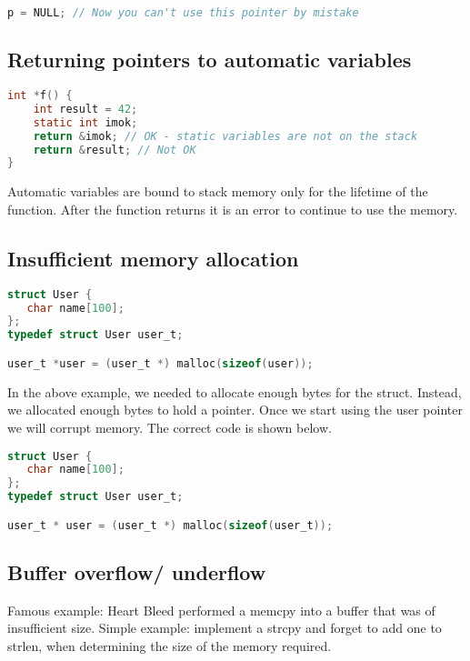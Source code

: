 \begin{lstlisting}[language=C]
p = NULL; // Now you can't use this pointer by mistake
\end{lstlisting}

\subsection{Returning pointers to automatic variables}

\begin{lstlisting}[language=C]
int *f() {
    int result = 42;
    static int imok;
    return &imok; // OK - static variables are not on the stack
    return &result; // Not OK
}
\end{lstlisting}

Automatic variables are bound to stack memory only for the lifetime of
the function. After the function returns it is an error to continue to
use the memory.

\subsection{Insufficient memory allocation}

\begin{lstlisting}[language=C]
struct User {
   char name[100];
};
typedef struct User user_t;

user_t *user = (user_t *) malloc(sizeof(user));
\end{lstlisting}

In the above example, we needed to allocate enough bytes for the struct.
Instead, we allocated enough bytes to hold a pointer.
Once we start using the user pointer we will corrupt memory.
The correct code is shown below.

\begin{lstlisting}[language=C]
struct User {
   char name[100];
};
typedef struct User user_t;

user_t * user = (user_t *) malloc(sizeof(user_t));
\end{lstlisting}

\subsection{Buffer overflow/ underflow}

Famous example: Heart Bleed performed a memcpy into a buffer that was of insufficient size.
Simple example: implement a strcpy and forget to add one to strlen, when determining the size of the memory required.

